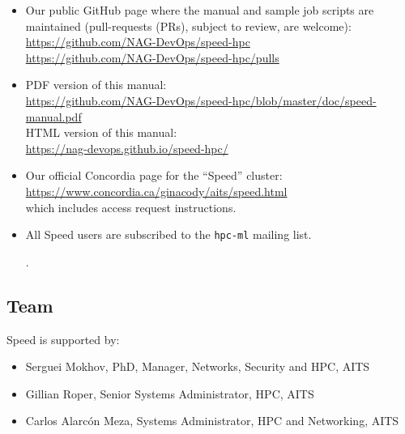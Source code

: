 \documentclass{easychair}
\begin{document}
\begin{itemize}
\item
Our public GitHub page where the manual and sample job scripts
are maintained (pull-requests (PRs), subject to review, are welcome):\\
\url{https://github.com/NAG-DevOps/speed-hpc}\\
\url{https://github.com/NAG-DevOps/speed-hpc/pulls}

\item
PDF version of this manual:\\
\url{https://github.com/NAG-DevOps/speed-hpc/blob/master/doc/speed-manual.pdf}\\
HTML version of this manual:\\
\url{https://nag-devops.github.io/speed-hpc/}

\item
Our official Concordia page for the ``Speed'' cluster:\\
\url{https://www.concordia.ca/ginacody/aits/speed.html}\\
which includes access request instructions.

\item
All Speed users are subscribed to the \texttt{hpc-ml} mailing
list.

\nocite{speed-intro-preso}.

\end{itemize}

\subsection{Team}
\label{sect:speed-team}

Speed is supported by:

\begin{itemize}
	\item 
Serguei Mokhov, PhD, Manager, Networks, Security and HPC, AITS
	\item 
Gillian Roper, Senior Systems Administrator, HPC, AITS
	\item 
Carlos Alarcón Meza, Systems Administrator, HPC and Networking, AITS
\end{itemize}
\end{document}
